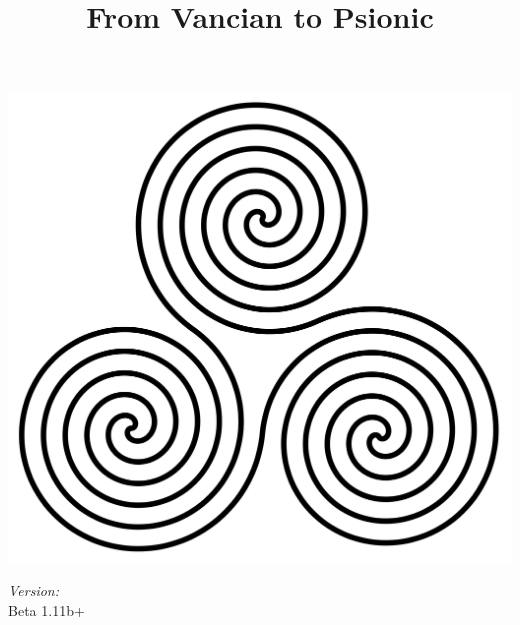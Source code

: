 \documentclass[a4paper,10pt]{article}
\title{From Vancian to Psionic}
\date{}
\author{}
\begin{document}
\begin{titlepage}
\maketitle
\thispagestyle{empty}
\includegraphics[width=\textwidth]{Pics/TripleSpiral.png}
\vfill
\begin{flushright} \large
\emph{Version:} \\
Beta 1.11b+
\end{flushright}
\end{titlepage}
\end{document}
